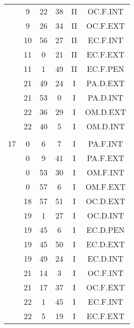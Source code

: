 \documentclass[12pt, a4paper]{article}
\begin{document}
\begin{multicols}{3}
{\begin{tabular}{c c c c c c}
	 	 	 	 & 9 & 22 & 38 & II & OC.F.INT\\%
	 	 	 	 & 9 & 26 & 34 & II & OC.F.EXT\\%
	 	 	 	 & 10 & 56 & 27 & II & EC.F.INT\\%
	 	 	 	 & 11 & 0 & 21 & II & EC.F.EXT\\%
	 	 	 	 & 11 & 1 & 49 & II & EC.F.PEN\\%
	 	 	 	 & 21 & 49 & 24 & I & PA.D.EXT\\%
	 	 	 	 & 21 & 53 & 0 & I & PA.D.INT\\%
	 	 	 	 & 22 & 36 & 29 & I & OM.D.EXT\\%
	 	 	 	 & 22 & 40 & 5 & I & OM.D.INT\\%
	 	 	 	 & & & & & \\%
	 	 	 	17 & 0 & 6 & 7 & I & PA.F.INT\\%
	 	 	 	 & 0 & 9 & 41 & I & PA.F.EXT\\%
	 	 	 	 & 0 & 53 & 30 & I & OM.F.INT\\%
	 	 	 	 & 0 & 57 & 6 & I & OM.F.EXT\\%
	 	 	 	 & 18 & 57 & 51 & I & OC.D.EXT\\%
	 	 	 	 & 19 & 1 & 27 & I & OC.D.INT\\%
	 	 	 	 & 19 & 45 & 6 & I & EC.D.PEN\\%
	 	 	 	 & 19 & 45 & 50 & I & EC.D.EXT\\%
	 	 	 	 & 19 & 49 & 24 & I & EC.D.INT\\%
	 	 	 	 & 21 & 14 & 3 & I & OC.F.INT\\%
	 	 	 	 & 21 & 17 & 37 & I & OC.F.EXT\\%
	 	 	 	 & 22 & 1 & 45 & I & EC.F.INT\\%
	 	 	 	 & 22 & 5 & 19 & I & EC.F.EXT\\%

\end{tabular}}
\end{multicols}
\end{document}
